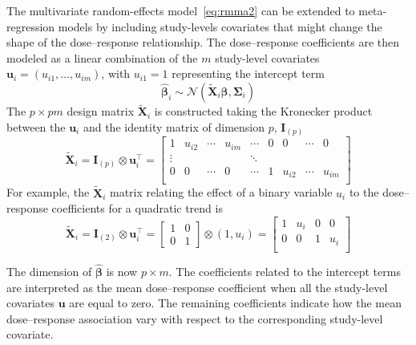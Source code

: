 \documentclass[11pt,a4paper,twoside,openany]{book}\usepackage{knitr}
\begin{document}
{\noindent The multivariate random-effects model~\ref{eq:rmma2} can be extended to meta-regression models by including study-levels covariates that might change the shape of the dose--response relationship. The dose--response coefficients are then modeled as a linear combination of the $m$ study-level covariates $\mathbf{u}_i = \left(u_{i1}, \dots, u_{im} \right)$, with $u_{i1} = 1$ representing the intercept term
\begin{equation}
\boldsymbol{\hat \beta}_i \sim \mathcal{N}\left(\widetilde{\mathbf{X}}_i \boldsymbol{\beta}, \boldsymbol{\Sigma}_i\right)
\label{eq:rmmra2}
\end{equation}
\noindent The $p\times pm$ design matrix $\widetilde{\mathbf{X}}_i$ is constructed taking the Kronecker product between the $\mathbf{u}_i$ and the identity matrix of dimension $p$, $\mathbf{I}_{(p)}$
\begin{equation}
\widetilde{\mathbf{X}}_i = \mathbf{I}_{(p)} \otimes \mathbf{u}_i^\top = 
	\begin{bmatrix}
		1 & u_{i2} & \cdots & u_{im} & \cdots & 0 & 0 & \cdots & 0 \\
		\vdots &  &  &  & \ddots & &  &  &  \\
		0 & 0 & \cdots & 0 & \cdots & 1 & u_{i2} & \cdots & u_{im} \\
	\end{bmatrix}
\end{equation}
\noindent For example, the $\widetilde{\mathbf{X}}_i$ matrix relating the effect of a binary variable $u_i$ to the dose--response coefficients for a quadratic trend is
\begin{equation*}
\widetilde{\mathbf{X}}_i = \mathbf{I}_{(2)} \otimes \mathbf{u}_i^\top = 
	\begin{bmatrix}
		1 & 0 \\
		0 & 1
	\end{bmatrix} \otimes
	(1, u_i)=
	\begin{bmatrix}
		1 & u_i  & 0 & 0 \\
		0 & 0 & 1 & u_i  \\
	\end{bmatrix}
\end{equation*} 

\noindent The dimension of $\boldsymbol{\hat \beta}$ is now $p\times m$. The coefficients related to the intercept terms are interpreted as the mean dose--response coefficient when all the study-level covariates $\mathbf{u}$ are equal to zero. The remaining coefficients indicate how the mean dose--response association vary with respect to the corresponding study-level covariate.


}
\end{document}
